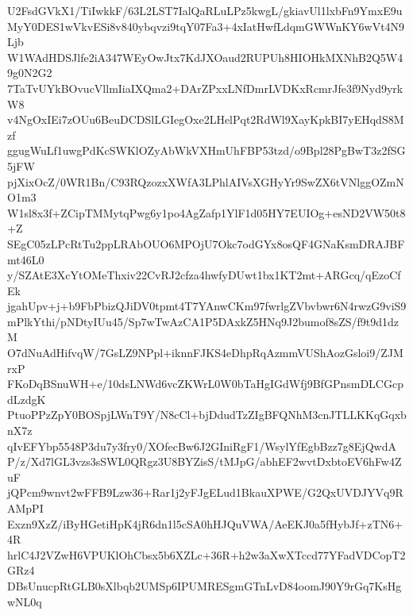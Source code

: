 U2FsdGVkX1/TiIwkkF/63L2LST7IalQaRLuLPz5kwgL/gkiavUl1lxbFn9YmxE9u
MyY0DES1wVkvESi8v840ybqvzi9tqY07Fa3+4xIatHwfLdqmGWWnKY6wVt4N9Ljb
W1WAdHDSJlfe2iA347WEyOwJtx7KdJXOaud2RUPUh8HIOHkMXNhB2Q5W49g0N2G2
7TaTvUYkBOvucVllmIiaIXQma2+DArZPxxLNfDmrLVDKxRcmrJfe3f9Nyd9yrkW8
v4NgOxIEi7zOUu6BeuDCDSlLGIegOxe2LHelPqt2RdWl9XayKpkBI7yEHqdS8Mzf
ggugWuLf1uwgPdKcSWKlOZyAbWkVXHmUhFBP53tzd/o9Bpl28PgBwT3z2fSG5jFW
pjXixOcZ/0WR1Bn/C93RQzozxXWfA3LPhlAIVsXGHyYr9SwZX6tVNlggOZmNO1m3
W1sl8x3f+ZCipTMMytqPwg6y1po4AgZafp1YlF1d05HY7EUIOg+esND2VW50t8+Z
SEgC05zLPcRtTu2ppLRAbOUO6MPOjU7Okc7odGYx8osQF4GNaKsmDRAJBFmt46L0
y/SZAtE3XcYtOMeThxiv22CvRJ2cfza4hwfyDUwt1bx1KT2mt+ARGcq/qEzoCfEk
jgahUpv+j+b9FbPbizQJiDV0tpmt4T7YAnwCKm97fwrlgZVbvbwr6N4rwzG9viS9
mPlkYthi/pNDtyIUu45/Sp7wTwAzCA1P5DAxkZ5HNq9J2bumof8sZS/f9t9d1dzM
O7dNuAdHifvqW/7GsLZ9NPpl+iknnFJKS4eDhpRqAzmmVUShAozGsloi9/ZJMrxP
FKoDqBSnuWH+e/10dsLNWd6vcZKWrL0W0bTaHgIGdWfj9BfGPnsmDLCGcpdLzdgK
PtuoPPzZpY0BOSpjLWnT9Y/N8cCl+bjDdudTzZIgBFQNhM3cnJTLLKKqGqxbnX7z
qIvEFYbp5548P3du7y3fry0/XOfecBw6J2GIniRgF1/WsylYfEgbBzz7g8EjQwdA
P/z/Xd7lGL3vzs3sSWL0QRgz3U8BYZisS/tMJpG/abhEF2wvtDxbtoEV6hFw4ZuF
jQPcm9wnvt2wFFB9Lzw36+Rar1j2yFJgELud1BkauXPWE/G2QxUVDJYVq9RAMpPI
Exzn9XzZ/iByHGetiHpK4jR6dn1l5cSA0hHJQuVWA/AeEKJ0a5fHybJf+zTN6+4R
hrlC4J2VZwH6VPUKlOhCbsx5b6XZLc+36R+h2w3aXwXTccd77YFadVDCopT2GRz4
DBsUnucpRtGLB0sXlbqb2UMSp6IPUMRESgmGTnLvD84oomJ90Y9rGq7KsHgwNL0q
